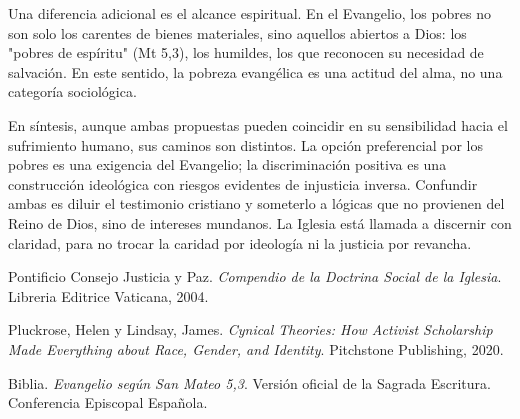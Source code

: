 \documentclass[12pt]{article}
\begin{document}
Una diferencia adicional es el alcance espiritual. En el Evangelio, los pobres no son solo los carentes de bienes materiales, sino aquellos abiertos a Dios: los "pobres de espíritu" (Mt 5,3), los humildes, los que reconocen su necesidad de salvación. En este sentido, la pobreza evangélica es una actitud del alma, no una categoría sociológica\cite{evangelio}.

En síntesis, aunque ambas propuestas pueden coincidir en su sensibilidad hacia el sufrimiento humano, sus caminos son distintos. La opción preferencial por los pobres es una exigencia del Evangelio; la discriminación positiva es una construcción ideológica con riesgos evidentes de injusticia inversa. Confundir ambas es diluir el testimonio cristiano y someterlo a lógicas que no provienen del Reino de Dios, sino de intereses mundanos. La Iglesia está llamada a discernir con claridad, para no trocar la caridad por ideología ni la justicia por revancha.

\begin{thebibliography}{9}

Pontificio Consejo Justicia y Paz.
\textit{Compendio de la Doctrina Social de la Iglesia}.
Libreria Editrice Vaticana, 2004.

Pluckrose, Helen y Lindsay, James.
\textit{Cynical Theories: How Activist Scholarship Made Everything about Race, Gender, and Identity}.
Pitchstone Publishing, 2020.

Biblia.
\textit{Evangelio según San Mateo 5,3}.
Versión oficial de la Sagrada Escritura. Conferencia Episcopal Española.

\end{thebibliography}
\end{document}

